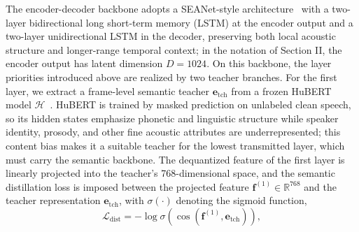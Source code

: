 \documentclass[lettersize,journal]{IEEEtran}
\begin{document}
The encoder-decoder backbone adopts a SEANet-style architecture~\cite{defossez2023encodec} with a two-layer bidirectional long short-term memory (LSTM) at the encoder output and a two-layer unidirectional LSTM in the decoder, preserving both local acoustic structure and longer-range temporal context; in the notation of Section II, the encoder output has latent dimension $D=1024$. On this backbone, the layer priorities introduced above are realized by two teacher branches. For the first layer, we extract a frame-level semantic teacher $\mathbf{e}_{\mathrm{tch}}$ from a frozen HuBERT model $\mathcal{H}$~\cite{hsu2021hubert}. HuBERT is trained by masked prediction on unlabeled clean speech, so its hidden states emphasize phonetic and linguistic structure while speaker identity, prosody, and other fine acoustic attributes are underrepresented; this content bias makes it a suitable teacher for the lowest transmitted layer, which must carry the semantic backbone. The dequantized feature of the first layer is linearly projected into the teacher's 768-dimensional space, and the semantic distillation loss is imposed between the projected feature $\mathbf{f}^{(1)}\in\mathbb{R}^{768}$ and the teacher representation $\mathbf{e}_{\mathrm{tch}}$, with $\sigma(\cdot)$ denoting the sigmoid function,
\begin{equation}
\mathcal{L}_{\mathrm{dist}}=-\log\sigma\!\left(\cos(\mathbf{f}^{(1)},\mathbf{e}_{\mathrm{tch}})\right),
\end{equation}
\end{document}
